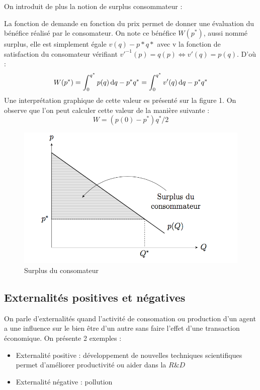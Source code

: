 On introduit de plus la notion de surplus consommateur : 
\begin{tcolorbox}[title=Surplus consommateur]
	La fonction de demande en fonction du prix permet de donner une évaluation du bénéfice réalisé par le consomateur. On note ce bénéfice $W(p^*)$, aussi nommé surplus, elle est simplement égale $v(q)-p*q*$ avec v la fonction de satisfaction du consomateur vérifiant $v'^{-1}(p)=q(p) \Leftrightarrow v'(q)=p(q)$. D'où :
	\[
		W(p^*)= \int_0^{q^*}p(q)\operatorname{d}\! q - p^*q^* = \int_0^{q^*}v'(q)\operatorname{d}\! q - p^*q^*
	\]
Une interprétation graphique de cette valeur es présenté sur la figure 1. On observe que l'on peut calculer cette valeur de la manière suivante :
\[
	W=(p(0)-p^*)q^*/2
\]

\end{tcolorbox}

\begin{figure}[h]
\begin{center}
\includegraphics[scale=0.7]{./img/IM1}
\caption{Surplus du consomateur}
\end{center}
\end{figure}



\subsection{Externalités positives et négatives} %
\label{sub:externalites_positives_et_negatives}

On parle d'externalités quand l'activité de consomation ou production d'un agent a une influence sur le bien être d'un autre sans faire l'effet d'une transaction économique. On présente 2 exemples :
\begin{itemize}
	\item Externalité positive : développement de nouvelles techniques scientifiques permet d'améliorer productivité ou aider dans la $R\&D$
	\item Externalité négative : pollution
\end{itemize}

